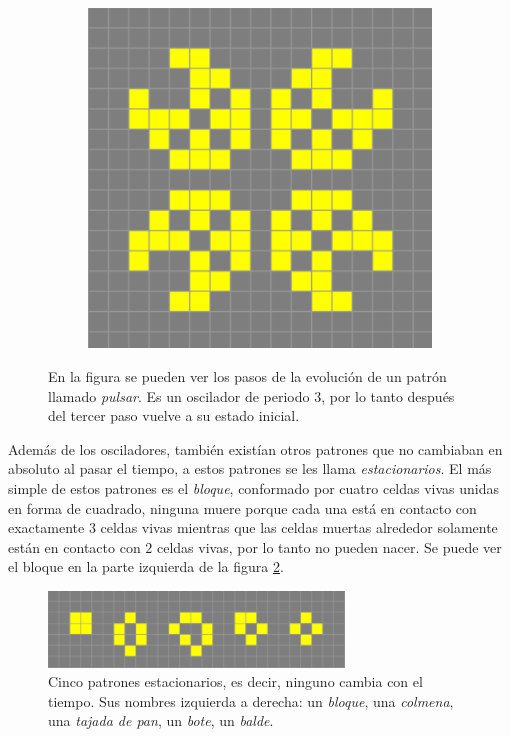 \begin{figure}[h]
\begin{subfigure}{0.3\textwidth}
    \end{subfigure}
    \begin{subfigure}{0.3\textwidth}
        \includegraphics[width=\textwidth]{images/life-pulsar-3.png}
    \end{subfigure}
    \caption{En la figura se pueden ver los pasos de la evoluci\'on de un patr\'on llamado \textit{pulsar}. Es un oscilador de periodo 3, por lo tanto despu\'es del tercer paso vuelve a su estado inicial.}
    \label{figure:pulsar}
\end{figure}

Adem\'as de los osciladores, tambi\'en exist\'ian otros patrones que no cambiaban en absoluto al pasar el tiempo, a estos patrones se les llama \textit{estacionarios}. El m\'as simple de estos patrones es el \textit{bloque}, conformado por cuatro celdas vivas unidas en forma de cuadrado, ninguna muere porque cada una est\'a en contacto con exactamente $3$ celdas vivas mientras que las celdas muertas alrededor solamente est\'an en contacto con $2$ celdas vivas, por lo tanto no pueden nacer. Se puede ver el bloque en la parte izquierda de la figura \ref{figure:stationary}.

\begin{figure}[h]
    \centering
    \includegraphics[width=0.7\textwidth]{images/life-stationary.png}
    \caption{Cinco patrones estacionarios, es decir, ninguno cambia con el tiempo. Sus nombres izquierda a derecha: un \textit{bloque}, una \textit{colmena}, una \textit{tajada de pan}, un \textit{bote}, un \textit{balde}.}
    \label{figure:stationary}
\end{figure}

